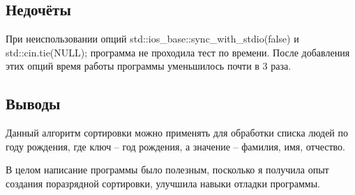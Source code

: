 \documentclass[12pt]{article}
\begin{document}

\subsection*{Недочёты}

При неиспользовании опций std::ios\_base::sync\_with\_stdio(false)  и  std::cin.tie(NULL); программа не проходила тест по времени. После добавления этих опций время работы программы уменьшилось почти в 3 раза.

\subsection*{Выводы}

Данный алгоритм сортировки можно применять для обработки списка людей по году рождения, где ключ -- год рождения, а значение -- фамилия, имя, отчество.

В целом написание программы было полезным, посколько я получила опыт создания поразрядной сортировки, улучшила навыки отладки программы. 
\end{document}
